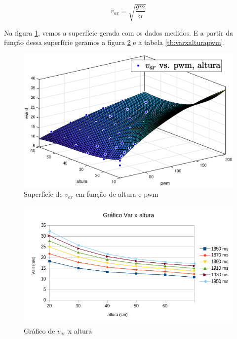\begin{equation}\label{eq:varx}
v_{ar}=\sqrt{\dfrac{gm}{\alpha}}
\end{equation}

Na figura \ref{fig:curvavar}, vemos a superfície gerada com os dados medidos. E a partir da função dessa superfície geramos a figura \ref{fig:graficovairaltura1} e a tabela \ref{tb:varxalturapwm}.

\begin{figure}[htb]
	\centering
	\includegraphics[width=1\linewidth]{pasta1_figuras/curvavar}
	\caption[Superfície de $v_{ar}$ em função de altura e pwm]{Superfície de $v_{ar}$ em função de altura e pwm}
	\label{fig:curvavar}
\end{figure}


\begin{figure}[htb]
	\centering
	\includegraphics[width=1\linewidth]{grafico_vair_altura}
	\caption[Gráfico $v_{ar}$ x altura]{Gráfico de $v_{ar}$ x altura}
	\label{fig:graficovairaltura1}
\end{figure}

